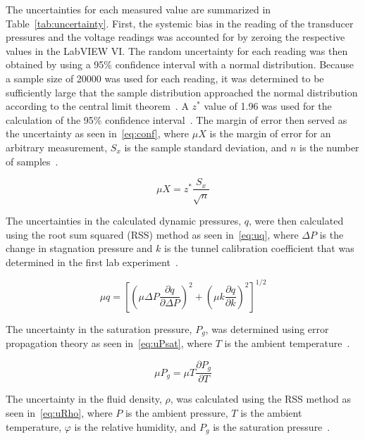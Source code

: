 \documentclass[journal,letterpaper]{IEEEtran}
\begin{document}
The uncertainties for each measured value are summarized in Table~\ref{tab:uncertainty}.
First, the systemic bias in the reading of the transducer pressures and the voltage readings was accounted for by zeroing the respective values in the LabVIEW VI.
The random uncertainty for each reading was then obtained by using a 95\% confidence interval with a normal distribution.
Because a sample size of 20000 was used for each reading, it was determined to be sufficiently large that the sample distribution approached the normal distribution according to the central limit theorem~\cite{MoMLecture}.
A $z^*$ value of 1.96 was used for the calculation of the 95\% confidence interval~\cite{MoMLecture}.
The margin of error then served as the uncertainty as seen in~\eqref{eq:conf}, where $\mu X$ is the margin of error for an arbitrary measurement, $S_x$ is the sample standard deviation, and $n$ is the number of samples~\cite{MoMLecture}.

\begin{equation} \label{eq:conf}
    \mu X = z^* \frac{S_x}{\sqrt{n}}
\end{equation}

The uncertainties in the calculated dynamic pressures, $q$, were then calculated using the root sum squared (RSS) method as seen in~\eqref{eq:uq}, where $\Delta P$ is the change in stagnation pressure and $k$ is the tunnel calibration coefficient that was determined in the first lab experiment~\cite{MoMLecture}.

\begin{equation} \label{eq:uq}
    \mu q = \left[\left(\mu \Delta P \frac{\partial q}{\partial \Delta P}\right)^2 + \left(\mu k \frac{\partial q}{\partial k}\right)^2\right]^{1/2}
\end{equation}

The uncertainty in the saturation pressure, $P_g$, was determined using error propagation theory as seen in~\eqref{eq:uPsat}, where $T$ is the ambient temperature~\cite{errorprop}.

\begin{equation} \label{eq:uPsat}
    \mu P_g = \mu T \frac{\partial P_g}{\partial T}
\end{equation}

The uncertainty in the fluid density, $\rho$, was calculated using the RSS method as seen in~\eqref{eq:uRho}, where $P$ is the ambient pressure, $T$ is the ambient temperature, $\varphi$ is the relative humidity, and $P_g$ is the saturation pressure~\cite{MoMLecture}.
\end{document}
